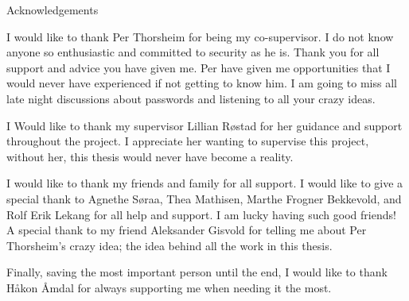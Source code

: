 {\centering 
{\Huge Acknowledgements} \\

\vspace{1cm}

I would like to thank Per Thorsheim for being my co-supervisor. I do not know anyone so enthusiastic and committed to security as he is. Thank you for all support and advice you have given me. Per have given me opportunities that I would never have experienced if not getting to know him. I am going to miss all late night discussions about passwords and listening to all your crazy ideas. 

I Would like to thank my supervisor Lillian Røstad for her guidance and support throughout the project. I appreciate her wanting to supervise this project, without her, this thesis would never have become a reality.

I would like to thank my friends and family for all support. I would like to give a special thank to Agnethe Søraa, Thea Mathisen, Marthe Frogner Bekkevold, and Rolf Erik Lekang for all help and support. I am lucky having such good friends! A special thank to my friend Aleksander Gisvold for telling me about Per Thorsheim's crazy idea; the idea behind all the work in this thesis.

Finally, saving the most important person until the end, I would like to thank Håkon Åmdal for always supporting me when needing it the most.

}

\clearpage
\mbox{}
\thispagestyle{empty}
\newpage